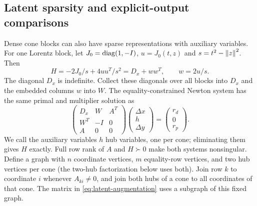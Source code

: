 \subsection{Latent sparsity and explicit-output comparisons}
Dense cone blocks can also have sparse representations with auxiliary
variables. For one Lorentz block, let
$J_0=\operatorname{diag}(1,-I)$, $u=J_0(t,z)$ and $s=t^2-\left\lVert z\right\rVert^2$. Then
\begin{equation}\label{eq:onehub}
 H=-2J_0/s+4uu^T/s^2=D_x+ww^T,
 \qquad w=2u/s.
\end{equation}
The diagonal $D_x$ is indefinite. Collect these diagonals over all blocks
into $D_x$ and the embedded columns $w$ into $W$. The equality-constrained
Newton system has the same primal and multiplier solution as
\begin{equation}\label{eq:latent-augmentation}
 \begin{pmatrix}D_x&W&A^T\\W^T&-I&0\\A&0&0\end{pmatrix}
 \begin{pmatrix}\Delta x\\h\\\Delta y\end{pmatrix}
 =\begin{pmatrix}r_d\\0\\r_p\end{pmatrix}.
\end{equation}
We call the auxiliary variables $h$ hub variables, one per cone;
eliminating them gives $H$ exactly. Full row rank of $A$
and $H\succ0$ make both systems nonsingular. Define a graph with $n$
coordinate vertices, $m$ equality-row vertices, and two hub vertices per
cone (the two-hub factorization below uses both). Join row $k$ to
coordinate $i$ whenever $A_{ki}\ne0$, and join both hubs of a cone to all
coordinates of that cone. The matrix in
\eqref{eq:latent-augmentation} uses a subgraph of this fixed graph.

